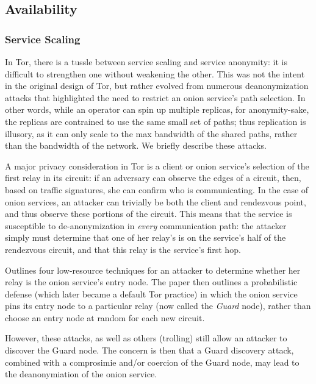 \subsection{Availability}

\subsubsection{Service Scaling}

In Tor, there is a tussle between service scaling and service anonymity:
it is difficult to strengthen one without weakening the other.
%
This was not the intent in the original design of Tor, but rather evolved from
numerous deanonymization attacks that highlighted the need to restrict an onion
service's path selection.
%
In other words, while an operator can spin up multiple replicas, for
anonymity-sake, the replicas are contrained to use the same small set of paths;
thus replication is illusory, as it can only scale to the max bandwidth of the
shared paths, rather than the bandwidth of the network.
%
We briefly describe these attacks.


A major privacy consideration in Tor is a client or onion service's
selection of the first relay in its circuit: if an adversary can observe the
edges of a circuit, then, based on traffic signatures, she can confirm
who is communicating.  
%
In the case of onion services, an attacker can trivially be both the client
and rendezvous point, and thus observe these portions of the circuit.
%
This means that the service is susceptible to de-anonymization in \emph{every}
communication path: the attacker simply must determine that one of her relay's
is on the service's half of the rendezvous circuit, and that this relay is the
service's first hop.

Outlines four low-resource techniques for an attacker to
determine whether her relay is the onion service's entry node.
%
The paper then outlines a probabilistic defense (which later became a default
Tor practice)  in which the onion service pins its entry node to a particular
relay (now called the \emph{Guard} node), rather than choose an entry node
at random for each new circuit.


However, these attacks, as well as others (trolling) still allow an attacker to
discover the Guard node.
%
The concern is then that a Guard discovery attack, combined with a comprosimie
and/or coercion of the Guard node, may lead to the deanonymiation of the onion
service.


